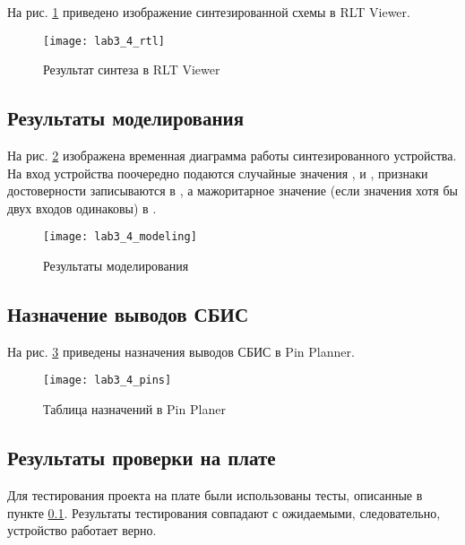 На рис. \ref{fig:lab3_4_rtl} приведено изображение синтезированной схемы в RLT Viewer.

\begin{figure}[H]
\begin{center}
	\texttt{[image: lab3\_4\_rtl]}
	\caption{Результат синтеза в RLT Viewer}
	\label{fig:lab3_4_rtl}
\end{center}
\end{figure}

\subsection{Результаты моделирования}
\label{sec:lab3_4_modeling}

На рис. \ref{fig:lab3_4_modeling} изображена временная диаграмма работы синтезированного устройства. На вход устройства поочередно подаются случайные значения ,  и , признаки достоверности записываются в , а мажоритарное значение (если значения хотя бы двух входов одинаковы) в .

\begin{figure}[H]
\begin{center}
	\texttt{[image: lab3\_4\_modeling]}
	\caption{Результаты моделирования}
	\label{fig:lab3_4_modeling}
\end{center}
\end{figure}

\subsection{Назначение выводов СБИС}

На рис. \ref{fig:lab3_4_pins} приведены назначения выводов СБИС в Pin Planner.

\begin{figure}[H]
\begin{center}
	\texttt{[image: lab3\_4\_pins]}
	\caption{Таблица назначений в Pin Planer}
	\label{fig:lab3_4_pins}
\end{center}
\end{figure}

\subsection{Результаты проверки на плате}

Для тестирования проекта на плате были использованы тесты, описанные в пункте \ref{sec:lab3_4_modeling}. Результаты тестирования совпадают с ожидаемыми, следовательно, устройство работает верно.

